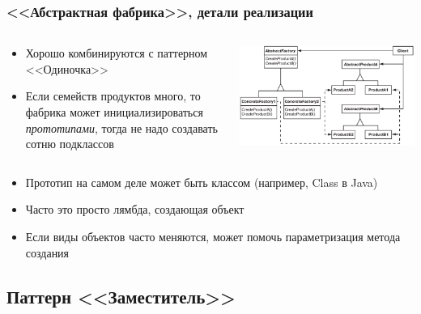 \documentclass[xetex,mathserif,serif]{beamer}
\begin{document}
    \begin{frame}
        \frametitle{<<Абстрактная фабрика>>, детали реализации}
        \begin{columns}
            \begin{column}{0.5\textwidth}
                \begin{itemize}
                    \item Хорошо комбинируются с паттерном <<Одиночка>>
                    \item Если семейств продуктов много, то фабрика может инициализироваться \textit{прототипами}, тогда не надо создавать сотню подклассов
                \end{itemize}
            \end{column}
            \begin{column}{0.5\textwidth}
                \begin{center}
                    \includegraphics[width=\textwidth]{abstractFactory.png}
                \end{center}
            \end{column}
        \end{columns}
        \begin{itemize}
            \item Прототип на самом деле может быть классом (например, Class в Java)
            \item Часто это просто лямбда, создающая объект
            \item Если виды объектов часто меняются, может помочь параметризация метода создания
        \end{itemize}
    \end{frame}

    \subsection{Паттерн <<Заместитель>>}
\end{document}
